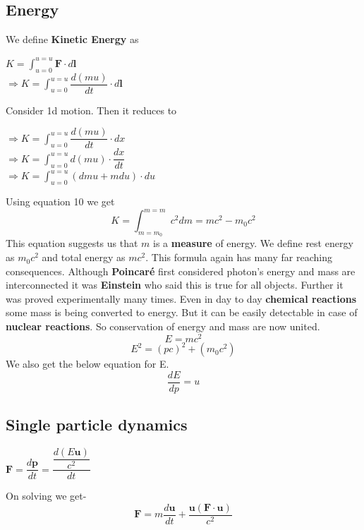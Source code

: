\documentclass[12pt,a4paper]{article}
\numberwithin{table}{section}
\numberwithin{figure}{section}
\numberwithin{equation}{section}
\theoremstyle{remark}
\theoremstyle{definition}
\begin{document}
\subsection{Energy}
We define \textbf{Kinetic Energy} as
\begin{center}
    $K= \int_{u=0}^{u=u}\textbf{F}\cdot{d\textbf{l}}$\\
    $\Rightarrow K= \int_{u=0}^{u=u}\dfrac{d(mu)}{dt}\cdot{d\textbf{l}}$\\
\end{center}
Consider 1d motion. Then it reduces to
\begin{center}  
    $\Rightarrow K= \int_{u=0}^{u=u}\dfrac{d(mu)}{dt}\cdot{dx}$\\
    $\Rightarrow K= \int_{u=0}^{u=u}d(mu)\cdot\dfrac{dx}{dt}$\\
    $\Rightarrow K= \int_{u=0}^{u=u}(dmu+mdu)\cdot du $\\
\end{center}
Using equation 10 we get\\
\begin{equation}
K=\int_{m=m_0}^{m=m}c^2dm=mc^2-m_0c^2
\end{equation}
This equation suggests us that $m$ is a \textbf{measure} of energy. We define rest energy as $m_0c^2$ and total energy as $mc^2$. This formula again has many far reaching consequences. Although \textbf{Poincaré} first considered photon's energy and mass are interconnected it was \textbf{Einstein} who said this is true for all objects. Further it was proved experimentally many times. Even in day to day \textbf{chemical reactions} some mass is being converted to energy. But it can be easily detectable in case of \textbf{nuclear reactions}. So conservation of energy and mass are now united.
\begin{equation}
    E=mc^2
\end{equation}
\begin{equation}
    E^2=(pc)^2+(m_0c^2)
\end{equation}
We also get the below equation for E.
\begin{equation}
    \dfrac{dE}{dp}=u
\end{equation}

\subsection{Single particle dynamics}
\begin{center}
    $\textbf{F}=\dfrac{d\textbf{p}}{dt}=\dfrac{\dfrac{d(E\textbf{u})}{c^2}}{dt}$
\end{center}
On solving we get-
\begin{equation}
    \textbf{F}=m\dfrac{d\textbf{u}}{dt}+\dfrac{{\textbf{u}(\textbf{F}\cdot\textbf{u})}}{c^2}
\end{equation}
 
\end{document}
